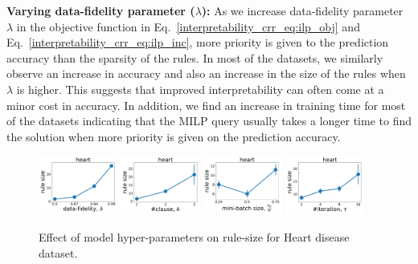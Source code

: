 	\textbf{Varying data-fidelity parameter ($ \lambda $):}  As we increase data-fidelity parameter $ \lambda $ in the objective function in Eq.~\ref{interpretability_crr_eq:ilp_obj} and Eq.~\ref{interpretability_crr_eq:ilp_inc}, more priority is given to the prediction accuracy than the sparsity of the rules.  In most of the datasets, we similarly observe an increase in accuracy  and also an increase in the size of the rules when $ \lambda $ is higher. This suggests that improved interpretability can often come at a  minor cost in accuracy.  
	In addition, we  find an increase in training time for most of the datasets indicating that the MILP query usually takes a longer time to find the solution when more priority is given on the prediction accuracy.  
	
	\begin{figure}[t]
		\centering
		\subfloat
		{\includegraphics[width=0.23\textwidth]{figures/interpretability/relaxed-cnf/heart_rule_size_vary_lambda.pdf}\label{interpretability_crr_fig:c}} \hfill
		\subfloat
		{\includegraphics[width=0.23\textwidth]{figures/interpretability/relaxed-cnf/heart_rule_size_vary_clause.pdf}\label{interpretability_crr_fig:h}} \hfill
		\subfloat
		{\includegraphics[width=0.23\textwidth]{figures/interpretability/relaxed-cnf/heart_rule_size_vary_subsamplesize.pdf}\label{interpretability_crr_fig:b}} \hfill 
		\subfloat
		{\includegraphics[width=0.23\textwidth]{figures/interpretability/relaxed-cnf/heart_rule_size_vary_iteration.pdf}\label{interpretability_crr_fig:e}} \hfill
		\caption[Effect of hyper-parameters on rule-size in {\crr}]{Effect of model hyper-parameters on rule-size for  Heart disease dataset.} 
		
		\label{interpretability_crr_fig:result_2}
	\end{figure}
	
